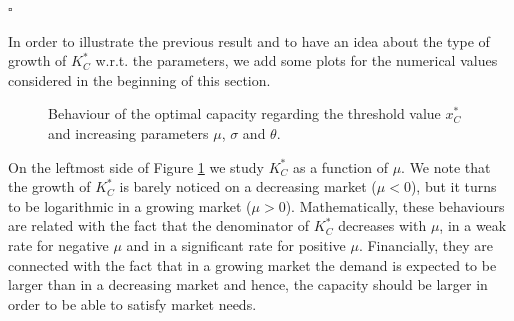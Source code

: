 \begin{flushright}
	$\square$
\end{flushright}

In order to illustrate the previous result and to have an idea about the type of growth of $K^*_C$ w.r.t. the parameters, we add some plots for the numerical values considered in the beginning of this section.

\begin{figure}[!htb]
	\begin{subfigmatrix}{3}
	\end{subfigmatrix}
	\caption{Behaviour of the optimal capacity regarding the threshold value $x^*_C$ and increasing parameters $\mu$, $\sigma$ and $\theta$.}
	\label{fig:k1}
\end{figure}

On the leftmost side of Figure \ref{fig:k1} we study $K^*_C$ as a function of $\mu$. We note that the growth of $K^*_C$ is barely noticed on a decreasing market ($\mu<0$), but it turns to be logarithmic in a growing market ($\mu>0$). Mathematically, these behaviours are related with the fact that the denominator of $K^*_C$ decreases with $\mu$, in a weak rate for negative $\mu$ and in a significant rate for positive $\mu$. Financially, they are connected with the fact that in a growing market the demand is expected to be larger than in a decreasing market and hence, the capacity should be larger in order to be able to satisfy market needs.


